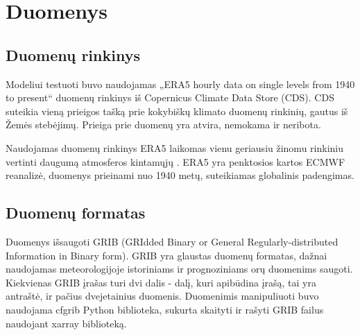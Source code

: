 \documentclass[conference]{IEEEtran}
\begin{document}






\section{Duomenys}

\subsection{Duomenų rinkinys}
Modeliui testuoti buvo naudojamas „ERA5 hourly data on single levels from 1940 to present“ duomenų rinkinys iš Copernicus Climate Data Store (CDS). CDS suteikia vieną prieigos tašką prie kokybiškų klimato duomenų rinkinių, gautus iš Žemės stebėjimų. Prieiga prie duomenų yra atvira, nemokama ir neribota. 

Naudojamas duomenų rinkinys ERA5 \cite{data} laikomas vienu geriausiu žinomu rinkiniu vertinti daugumą atmosferos kintamųjų \cite{evaluationoftheERA5}. ERA5 yra penktosios kartos ECMWF reanalizė, duomenys prieinami nuo 1940 metų, suteikiamas globalinis padengimas. 

\subsection{Duomenų formatas}
Duomenys išsaugoti GRIB (GRIdded Binary or General Regularly-distributed Information in Binary form). GRIB yra glaustas duomenų formatas, dažnai naudojamas meteorologijoje istoriniams ir prognoziniams orų duomenims saugoti. Kiekvienas GRIB įrašas turi dvi dalis - dalį, kuri apibūdina įrašą, tai yra antraštė, ir pačius dvejetainius duomenis. Duomenimis manipuliuoti buvo naudojama cfgrib Python biblioteka, sukurta skaityti ir rašyti GRIB failus naudojant xarray biblioteką.   
\end{document}
